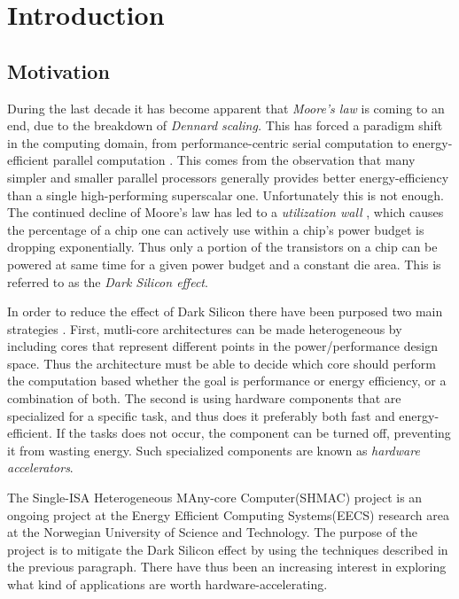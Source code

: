 \chapter{Introduction}

\section{Motivation}

During the last decade it has become apparent that \textit{Moore's law} is coming to an end, due to the breakdown of \textit{Dennard scaling.} This has forced a paradigm shift  in the computing domain, from performance-centric serial computation to energy-efficient parallel computation \cite{Duranton2013}. This comes from the observation that many simpler and smaller parallel processors generally provides better energy-efficiency than a single high-performing superscalar one. Unfortunately this is not enough. The continued decline of Moore's law has led to a \textit{utilization wall} \cite{Venkatesh2010}, which causes the percentage of a chip one can actively use within a chip's power budget is dropping exponentially. Thus only a portion of the transistors on a chip can be powered at same time for a given power budget and a constant die
area. This is referred to as the \textit{Dark Silicon effect}.

In order to reduce the effect of Dark Silicon there have been purposed two main strategies \cite{Olukotun2011}. First, mutli-core architectures can be made heterogeneous by including cores that represent different points in the power/performance design space. Thus the architecture must be able to decide which core should perform the computation based whether the goal is performance or energy efficiency, or a combination of both. The second is using hardware components that are specialized for a specific task, and thus does it preferably both fast and energy-efficient. If the tasks does not occur, the component can be turned off, preventing it from wasting energy. Such specialized components are known as \textit{hardware accelerators}. 


The Single-ISA Heterogeneous MAny-core Computer(SHMAC) \cite{NTNU2014} project is an ongoing project at the Energy Efficient Computing Systems(EECS) research area at the Norwegian University of Science and Technology. The purpose of the project is to mitigate the Dark Silicon effect by using the techniques described in the previous paragraph. There have thus been an increasing interest in exploring what kind of applications are worth hardware-accelerating. 

